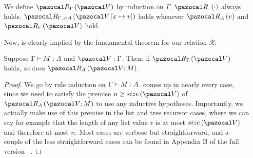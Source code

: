 \begin{definition}
We define $\Renv{\Gamma}{\env}$ by induction on $\Gamma$. $\Renv{\ctxnil}{\envnil}$ always holds. $\Renv{\ctxcons{\Gamma}{x}{A}}{\envcons{\env}{x}{v}}$ holds whenever $\Rval{A}{v}$ and $\Renv{\Gamma}{\env}$ hold.
\end{definition}

Now,  is clearly implied by the fundamental theorem for our relation $\mathcal R$:

\begin{theorem}
Suppose $\Gamma \vdash M : A$ and $\envtypes{\env}{\Gamma}$. Then, if $\Renv{\Gamma}{\env}$ holds, so does $\Rterm{A}{\env}{M}$.
\end{theorem}
\begin{proof}
We go by rule induction on $\Gamma \vdash M : A$.  comes up in nearly every case, since we need to satisfy the premise $n \ge \envsize{\env}$ of $\Rterm{A}{\env}{M}$ to use any inductive hypotheses. Importantly, we actually make use of this premise in the list and tree recursor cases, where we can say for example that the length of any list value $v$ is at most $\envsize{\env}$ and therefore at most $n$. Most cases are verbose but straightforward, and a couple of the less straightforward cases can be found in{
  \ifdefined\FULLVERSION
  \else
    Appendix B of the full version~\cite{fullversion}%
  \fi
}.
\end{proof}
